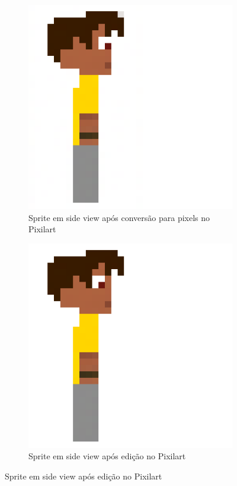 \begin{figure}[htbp]
    \begin{subfigure}{0.32\linewidth}
        \includegraphics[width=1\linewidth]{figs/geminiPro/passa_pixel_grande.png}
        \caption{\small Sprite em side view após conversão para pixels no Pixilart}
        \label{fig:geminiProSideEdicaoMelhorAposConversao}
    \end{subfigure}\hfill
    \begin{subfigure}{0.32 \linewidth}
        \centering
        \includegraphics[width=1\linewidth]{figs/geminiPro/fix grande.png}
        \caption{\small Sprite em side view após edição no Pixilart}
        \label{fig:geminiProSideEdicaoMelhorAposEdicao}
    \end{subfigure}
\end{figure}

